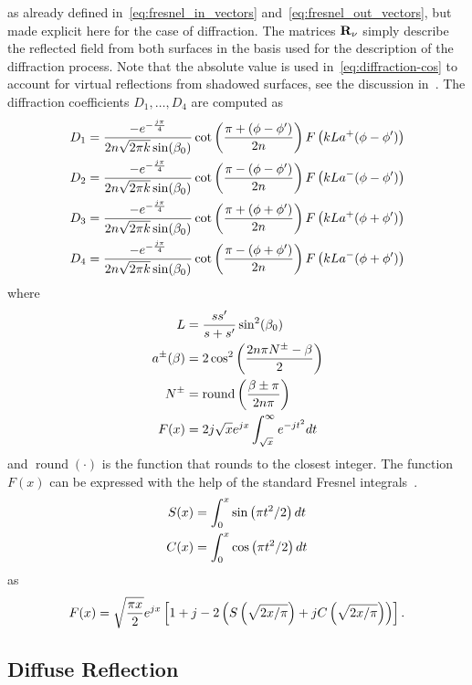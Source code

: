 as already defined in~\eqref{eq:fresnel_in_vectors} and~\eqref{eq:fresnel_out_vectors}, but made explicit here for the case of diffraction. The matrices $\mathbf{R}_\nu$ simply describe the reflected field from both surfaces in the basis used for the description of the diffraction process. Note that the absolute value is used in~\eqref{eq:diffraction-cos} to account for virtual reflections from shadowed surfaces, see the discussion in~\cite[p.185]{McNamara90}.
The diffraction coefficients $D_1,\dots,D_4$ are computed as
\begin{align}
    D_1 &= \frac{-e^{-\frac{j\pi}{4}}}{2n\sqrt{2\pi k} \sin(\beta_0)} \mathop{\text{cot}}\left( \frac{\pi+(\phi-\phi')}{2n} \right) F\left( k L a^+(\phi-\phi')\right)\\
    D_2 &= \frac{-e^{-\frac{j\pi}{4}}}{2n\sqrt{2\pi k} \sin(\beta_0)} \mathop{\text{cot}}\left( \frac{\pi-(\phi-\phi')}{2n} \right) F\left( k L a^-(\phi-\phi')\right)\\
    D_3 &= \frac{-e^{-\frac{j\pi}{4}}}{2n\sqrt{2\pi k} \sin(\beta_0)} \mathop{\text{cot}}\left( \frac{\pi+(\phi+\phi')}{2n} \right) F\left( k L a^+(\phi+\phi')\right)\\
    D_4 &= \frac{-e^{-\frac{j\pi}{4}}}{2n\sqrt{2\pi k} \sin(\beta_0)} \mathop{\text{cot}}\left( \frac{\pi-(\phi+\phi')}{2n} \right) F\left( k L a^-(\phi+\phi')\right)
\end{align}
where
\begin{align}
    L &= \frac{ss'}{s+s'}\sin^2(\beta_0)\\
    a^{\pm}(\beta) &= 2\cos^2\left( \frac{2n\pi N^{\pm}-\beta}{2} \right)\\
    N^{\pm} &= \mathop{\text{round}}\left( \frac{\beta\pm\pi}{2n\pi} \right)\\
    F(x) &= 2j\sqrt{x}e^{jx}\int_{\sqrt{x}}^\infty e^{-jt^2}dt
\end{align}
and $\mathop{\text{round}}(\cdot)$ is the function that rounds to the closest integer. The function $F(x)$ can be expressed with the help of the standard Fresnel integrals~\cite{Wikipedia_Fresnel}.
\begin{align}
    S(x) &= \int_0^x \sin\left( \pi t^2/2 \right) dt \\
    C(x) &= \int_0^x \cos\left( \pi t^2/2 \right) dt
\end{align}
as
\begin{equation}
    F(x) = \sqrt{\frac{\pi x}{2}} e^{jx} \left[ 1+j-2\left( S\left( \sqrt{2x/\pi} \right) +jC\left( \sqrt{2x/\pi} \right) \right) \right].
\end{equation}

\subsection{Diffuse Reflection}
\label{sec:primer-em-diffuse}

